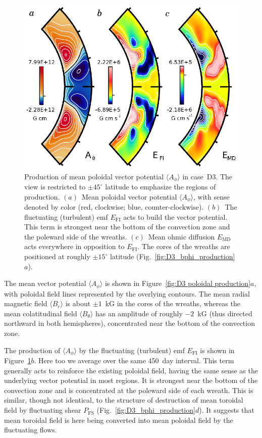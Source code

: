 \begin{figure}[!tp]
  \begin{center}
    \includegraphics[width=0.7\linewidth]{figs/chapter_7/Figure_14/Figure_14.eps}
  \end{center}
  \caption[Production of mean poloidal vector potential $\langle A_\phi \rangle$ in case~D3]
          {Production of mean poloidal vector potential $\langle A_\phi \rangle$ in case~D3.  
    The view is restricted to $\pm 45^\circ$ latitude to emphasize the
    regions of production.  $(a)$~Mean poloidal vector potential  
    $\langle A_\phi \rangle$, with sense denoted by color (red,
    clockwise; blue, counter-clockwise).
    $(b)$~The fluctuating (turbulent) emf
    $E_\mathrm{FI}$ acts to build the vector potential.  
    This term is strongest near the bottom of the convection zone and
    the poleward side of the wreaths.  
    $(c)$~Mean ohmic diffusion $E_\mathrm{MD}$ acts everywhere in
    opposition to $E_\mathrm{FI}$.  
    The cores of the wreaths are positioned at roughly
    $\pm15^\circ$ latitude (Fig.~\ref{fig:D3_bphi_production}$a$).
  \label{fig:D3 poloidal production}}
\end{figure}

The mean vector potential $\langle A_\phi \rangle$ is shown in Figure~\ref{fig:D3 poloidal
production}$a$, with poloidal field lines represented by the overlying contours.  
The mean radial magnetic field $\langle B_r \rangle$ is
about $\pm 1$~kG in the cores of the wreaths, whereas the mean colatitudinal
field $\langle B_\theta \rangle$ has an amplitude of roughly $-2$~kG
(thus directed northward in both hemispheres),
concentrated near the bottom of the convection zone.

\clearpage
The production of $\langle A_\phi \rangle$ by the fluctuating (turbulent) emf
$E_\mathrm{FI}$ is shown in Figure~\ref{fig:D3 poloidal production}$b$.  
Here too we average over the same 450~day interval.
This term generally acts to reinforce the
existing poloidal field, having the same sense as the underlying
vector potential in most regions.  It is strongest near the bottom of
the convection zone and is concentrated at the poleward  side of
each wreath.  This is similar, though not identical, to the structure
of destruction of mean toroidal field by fluctuating shear $P_\mathrm{FS}$
(Fig.~\ref{fig:D3_bphi_production}$d$).  It suggests that mean 
toroidal field is here being converted into mean poloidal field by the
fluctuating flows.  

